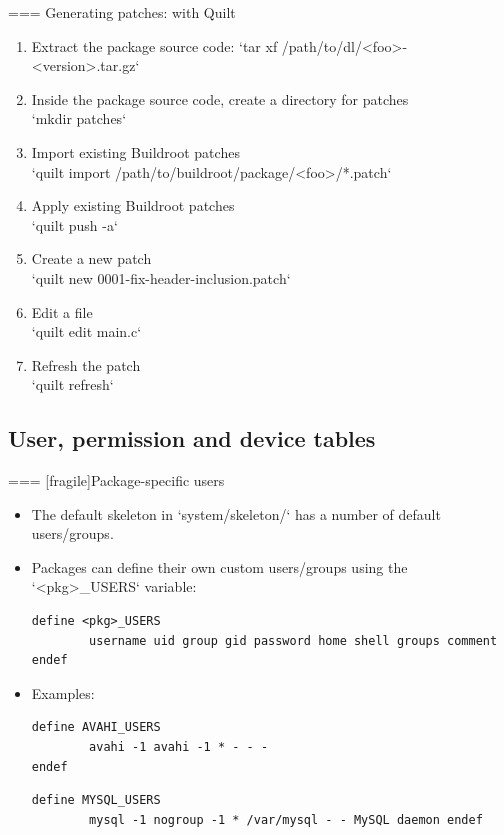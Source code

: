 === {Generating patches: with Quilt}

  \begin{enumerate}
  \item Extract the package source code:
    `tar xf /path/to/dl/<foo>-<version>.tar.gz`
  \item Inside the package source code, create a directory for patches\\
    `mkdir patches`
  \item Import existing Buildroot patches\\
    `quilt import /path/to/buildroot/package/<foo>/*.patch`
  \item Apply existing Buildroot patches\\
    `quilt push -a`
  \item Create a new patch\\
    `quilt new 0001-fix-header-inclusion.patch`
  \item Edit a file\\
    `quilt edit main.c`
  \item Refresh the patch\\
    `quilt refresh`
  \end{enumerate}



\subsection{User, permission and device tables}

=== [fragile]{Package-specific users}

\begin{itemize}

\item The default skeleton in `system/skeleton/` has a number of
  default users/groups.
\item Packages can define their own custom users/groups using the
  `<pkg>_USERS` variable:
{\footnotesize
  \begin{block}{}
\begin{verbatim}
define <pkg>_USERS
        username uid group gid password home shell groups comment endef
\end{verbatim}
  \end{block}}
\item Examples:
  \begin{block}{}
    \begin{verbatim}
define AVAHI_USERS
        avahi -1 avahi -1 * - - -
endef
\end{verbatim}
\end{block}

\begin{block}{}
  \begin{verbatim}
define MYSQL_USERS
        mysql -1 nogroup -1 * /var/mysql - - MySQL daemon endef
  \end{verbatim}
\end{block}
\end{itemize}



